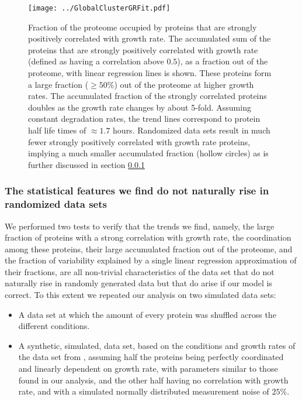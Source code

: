 \documentclass{article}
\begin{document}
\begin{figure}[H]
\begin{center}
\texttt{[image: ../GlobalClusterGRFit.pdf]}
\caption{\label{fig:globalgrcorr}
Fraction of the proteome occupied by proteins that are strongly positively correlated with growth rate.
The accumulated sum of the proteins that are strongly positively correlated with growth rate (defined as having a correlation above $0.5$), as a fraction out of the proteome, with linear regression lines is shown.
These proteins form a large fraction ($\ge 50\%$) out of the proteome at higher growth rates.
The accumulated fraction of the strongly correlated proteins doubles as the growth rate changes by about 5-fold.
Assuming constant degradation rates, the trend lines correspond to protein half life times of $\approx 1.7$ hours.
Randomized data sets result in much fewer strongly positively correlated with growth rate proteins, implying a much smaller accumulated fraction (hollow circles) as is further discussed in section \ref{randanalysis}
%
}
\end{center}
\end{figure}

\subsubsection{The statistical features we find do not naturally rise in randomized data sets}
\label{randanalysis}
We performed two tests to verify that the trends we find, namely, the large fraction of proteins with a strong correlation with growth rate, the coordination among these proteins, their large accumulated fraction out of the proteome, and the fraction of variability explained by a single linear regression approximation of their fractions, are all non-trivial characteristics of the data set that do not naturally rise in randomly generated data but that do arise if our model is correct.
To this extent we repeated our analysis on two simulated data sets:
\begin{itemize}
\item A data set at which the amount of every protein was shuffled across the different conditions.
\item A synthetic, simulated, data set, based on the conditions and growth rates of the data set from \cite{Schmidt2015}, assuming half the proteins being perfectly coordinated and linearly dependent on growth rate, with parameters similar to those found in our analysis, and the other half having no correlation with growth rate, and with a simulated normally distributed measurement noise of $25\%$.
\end{itemize}
\end{document}
